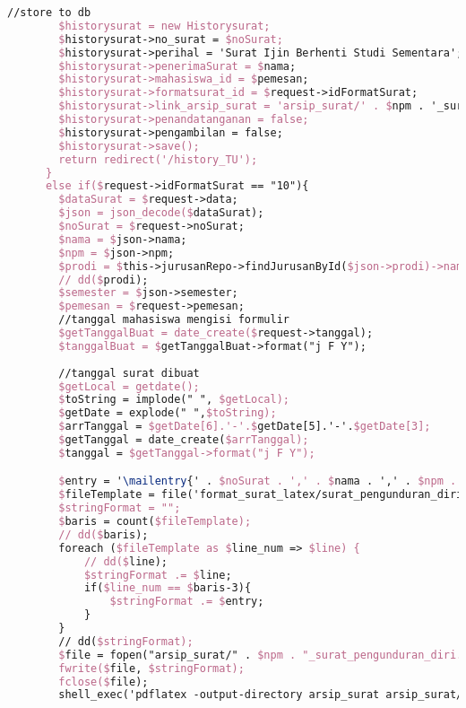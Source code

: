 \begin{lstlisting}[language=tex,basicstyle=\tiny,caption=HistorysuratController.php]
        //store to db
        $historysurat = new Historysurat;
        $historysurat->no_surat = $noSurat;
        $historysurat->perihal = 'Surat Ijin Berhenti Studi Sementara';
        $historysurat->penerimaSurat = $nama;
        $historysurat->mahasiswa_id = $pemesan;
        $historysurat->formatsurat_id = $request->idFormatSurat;
        $historysurat->link_arsip_surat = 'arsip_surat/' . $npm . '_surat_izin_cuti_studi.pdf';
        $historysurat->penandatanganan = false;
        $historysurat->pengambilan = false;
        $historysurat->save();
        return redirect('/history_TU');
      }
      else if($request->idFormatSurat == "10"){
        $dataSurat = $request->data;
        $json = json_decode($dataSurat);
        $noSurat = $request->noSurat;
        $nama = $json->nama;
        $npm = $json->npm;
        $prodi = $this->jurusanRepo->findJurusanById($json->prodi)->nama_jurusan;
        // dd($prodi);
        $semester = $json->semester;
        $pemesan = $request->pemesan;
        //tanggal mahasiswa mengisi formulir
        $getTanggalBuat = date_create($request->tanggal);
        $tanggalBuat = $getTanggalBuat->format("j F Y");
        
        //tanggal surat dibuat
        $getLocal = getdate();
        $toString = implode(" ", $getLocal);
        $getDate = explode(" ",$toString);
        $arrTanggal = $getDate[6].'-'.$getDate[5].'-'.$getDate[3];
        $getTanggal = date_create($arrTanggal);
        $tanggal = $getTanggal->format("j F Y");

        $entry = '\mailentry{' . $noSurat . ',' . $nama . ',' . $npm . ',' . $prodi . ',' . $tanggalBuat . ',' . $semester . ',' . $tanggal . '}';
        $fileTemplate = file('format_surat_latex/surat_pengunduran_diri.tex');
        $stringFormat = "";
        $baris = count($fileTemplate);
        // dd($baris);
        foreach ($fileTemplate as $line_num => $line) {
            // dd($line);
            $stringFormat .= $line;
            if($line_num == $baris-3){
                $stringFormat .= $entry;
            }
        }
        // dd($stringFormat);
        $file = fopen("arsip_surat/" . $npm . "_surat_pengunduran_diri.tex", "w");
        fwrite($file, $stringFormat);
        fclose($file);
        shell_exec('pdflatex -output-directory arsip_surat arsip_surat/' . $npm . '_surat_pengunduran_diri.tex');


\end{lstlisting}
